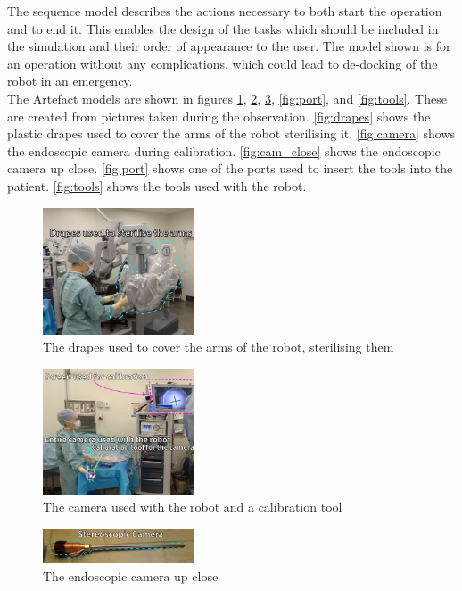 The sequence model describes the actions necessary to both start the operation and to end it. This enables the design of the tasks which should be included in the simulation and their order of appearance to the user.
The model shown is for an operation without any complications, which could lead to de-docking of the robot in an emergency.\\


The Artefact models are shown in figures \ref{fig:drapes}, \ref{fig:camera}, \ref{fig:cam_close}, \ref{fig:port}, and \ref{fig:tools}. These are created from pictures taken during the observation. \autoref{fig:drapes} shows the plastic drapes used to cover the arms of the robot sterilising it. \autoref{fig:camera} shows the endoscopic camera during calibration. \autoref{fig:cam_close} shows the endoscopic camera up close. \autoref{fig:port} shows one of the ports used to insert the tools into the patient. \autoref{fig:tools} shows the tools used with the robot.


\begin{figure}[hbpt]
	\centering
	\includegraphics[width=0.4\textwidth]{OperationRoom/drapes.pdf}
	\caption{The drapes used to cover the arms of the robot, sterilising them}
	\label{fig:drapes}
\end{figure}

\begin{figure}[hbpt]
	\centering
	\includegraphics[width=0.4\textwidth]{OperationRoom/camera.pdf}
	\caption{The camera used with the robot and a calibration tool}
	\label{fig:camera}
\end{figure}

\begin{figure}[hbpt]
	\centering
	\includegraphics[width=0.4\textwidth]{OperationRoom/camera_close}
	\caption{The endoscopic camera up close}
	\label{fig:cam_close}
\end{figure}

